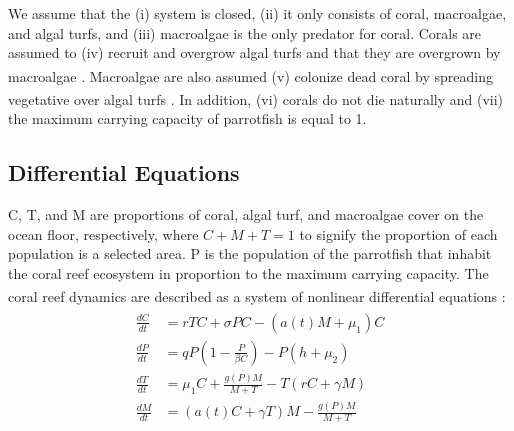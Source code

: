 \documentclass[12pt]{article}
\begin{document}
We assume that the (i) system is closed, (ii) it only consists of coral, macroalgae, and algal turfs, and (iii) macroalgae is the only predator for coral. Corals are assumed to (iv) recruit and overgrow algal turfs and that they are overgrown by macroalgae \textsuperscript{\cite{04_mathanalysis}}. Macroalgae are also assumed (v) colonize dead coral by spreading vegetative over algal turfs \textsuperscript{\cite{04_mathanalysis}}. In addition, (vi) corals do not die naturally and (vii) the maximum carrying capacity of parrotfish is equal to 1.


\subsection{Differential Equations}
C, T, and M are proportions of coral, algal turf, and macroalgae cover on the ocean floor, respectively,  where $C+M+T=1$ to signify the proportion of each population is a selected area. P is the population of the parrotfish that inhabit the coral reef ecosystem in proportion to the maximum carrying capacity. The coral reef dynamics are described as a system of nonlinear differential equations \textsuperscript{\cite{13_blackwood_hastings_mumby_2010}}: 
\begin{align}
    \begin{split}
        \frac{dC}{dt} &= rTC + \sigma P C- (a(t)M+\mu_{1})C\\
        \frac{dP}{dt} &= qP \left( 1-\frac{P}{\beta C} \right) - P \left( h+\mu_{2} \right)\\
        \frac{dT}{dt} &= \mu_{1}C + \frac{g(P)M}{M+T} - T(rC+\gamma M)\\
        \frac{dM}{dt} &= (a(t)C+ \gamma T)M - \frac{g(P)M}{M+T}
    \end{split}
\end{align}
\end{document}
